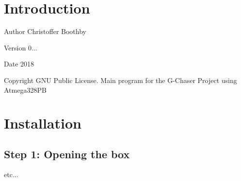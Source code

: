\hypertarget{index_intro_sec}{}\section{Introduction}\label{index_intro_sec}
\begin{DoxyAuthor}{Author}
Christoffer Boothby 
\end{DoxyAuthor}
\begin{DoxyVersion}{Version}
0... 
\end{DoxyVersion}
\begin{DoxyDate}{Date}
2018 
\end{DoxyDate}
\begin{DoxyCopyright}{Copyright}
G\+NU Public License. Main program for the G-\/\+Chaser Project using Atmega328\+PB
\end{DoxyCopyright}
\hypertarget{index_install_sec}{}\section{Installation}\label{index_install_sec}
\hypertarget{index_step1}{}\subsection{Step 1\+: Opening the box}\label{index_step1}
etc... 